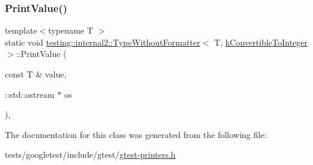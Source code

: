 \subsubsection{\texorpdfstring{Print\+Value()}{PrintValue()}}
{\footnotesize\ttfamily template$<$typename T $>$ \\
static void \hyperlink{classtesting_1_1internal2_1_1TypeWithoutFormatter}{testing\+::internal2\+::\+Type\+Without\+Formatter}$<$ T, \hyperlink{namespacetesting_1_1internal2_aeb8161b0b3ee503347b0662d7028fd57a9bdcf3f1548f498b2b7f097306ea0224}{k\+Convertible\+To\+Integer} $>$\+::Print\+Value (\begin{DoxyParamCaption}\item[{const T \&}]{value,  }\item[{\+::std\+::ostream $\ast$}]{os }\end{DoxyParamCaption})\hspace{0.3cm}{\ttfamily [inline]}, {\ttfamily [static]}}



The documentation for this class was generated from the following file\+:\begin{DoxyCompactItemize}
\item 
tests/googletest/include/gtest/\hyperlink{gtest-printers_8h}{gtest-\/printers.\+h}\end{DoxyCompactItemize}
